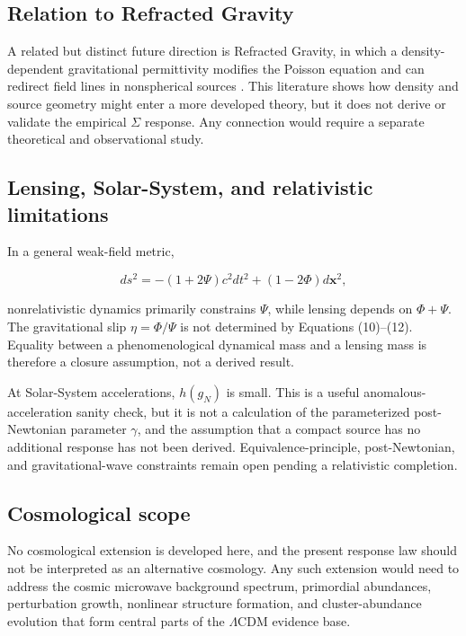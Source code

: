 \documentclass[utf8]{FrontiersinHarvard}
\begin{document}
\subsection{Relation to Refracted Gravity}\label{relation-to-refracted-gravity}

A related but distinct future direction is Refracted Gravity, in which a density-dependent gravitational permittivity modifies the Poisson equation and can redirect field lines in nonspherical sources \citep{cesare2020,cesare2022,sanna2023}. This literature shows how density and source geometry might enter a more developed theory, but it does not derive or validate the empirical \(\Sigma\) response. Any connection would require a separate theoretical and observational study.

\subsection{Lensing, Solar-System, and relativistic limitations}\label{lensing-solar-system-and-relativistic-limitations}

In a general weak-field metric,

\[
ds^2=-(1+2\Psi)c^2dt^2+(1-2\Phi)d\mathbf x^2,
\tag{20}
\]

nonrelativistic dynamics primarily constrains \(\Psi\), while lensing depends on \(\Phi+\Psi\). The gravitational slip \(\eta=\Phi/\Psi\) is not determined by Equations (10)--(12). Equality between a phenomenological dynamical mass and a lensing mass is therefore a closure assumption, not a derived result.

At Solar-System accelerations, \(h(g_N)\) is small. This is a useful anomalous-acceleration sanity check, but it is not a calculation of the parameterized post-Newtonian parameter \(\gamma\), and the assumption that a compact source has no additional response has not been derived. Equivalence-principle, post-Newtonian, and gravitational-wave constraints remain open pending a relativistic completion.

\subsection{Cosmological scope}\label{cosmological-scope}

No cosmological extension is developed here, and the present response law should not be interpreted as an alternative cosmology. Any such extension would need to address the cosmic microwave background spectrum, primordial abundances, perturbation growth, nonlinear structure formation, and cluster-abundance evolution that form central parts of the \(\Lambda\)CDM evidence base.
\end{document}
